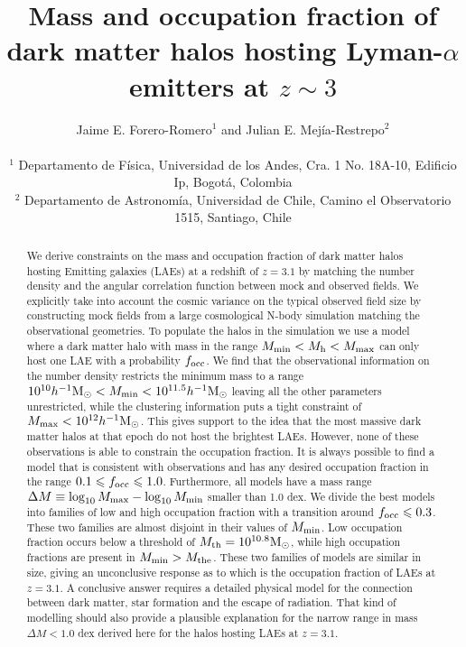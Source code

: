\documentclass[usenatbib]{mn2e}
\newcommand{\ly}{{\ifmmode{{\rm Ly}\alpha}\else{Ly$\alpha$~}\fi}}
\newcommand{\hMsun}{{\ifmmode{h^{-1}{\rm
        {M_{\odot}}}}\else{$h^{-1}{\rm{M_{\odot}}}$}\fi}}
\newcommand{\Msun}{{\ifmmode{{\rm {M_{\odot}}}}\else{${\rm{M_{\odot}}}$}\fi}}
\begin{document}
\title[Halo mass and occupation fraction for LAEs at
  $z=3.1$]{Mass and occupation
  fraction of dark matter halos hosting Lyman-$\alpha$ emitters
  at $z\sim 3$}    
\author[~J.~E. Forero-Romero and ~J.~E Mejia-Restreo]{
\parbox[t]{\textwidth}{\raggedright 
  Jaime E. Forero-Romero$^{1}$ and
  Julian E. Mej\'ia-Restrepo$^{2}$ 
}
\vspace*{6pt}\\
$^{1}$ Departamento de F\'{i}sica, Universidad de los Andes, Cra. 1
No. 18A-10, Edificio Ip, Bogot\'a, Colombia \\
$^{2}$ Departamento de Astronom\'{i}a, Universidad de Chile, Camino el
Observatorio 1515, Santiago, Chile} 

\maketitle

\begin{abstract}
%
We derive constraints on the mass and occupation fraction of dark
matter halos hosting \ly Emitting galaxies (LAEs) at a redshift of
$z=3.1$ by matching the number density and the angular
correlation function between mock and observed fields. We explicitly
take into account the cosmic variance on the typical observed field size by
constructing mock fields from a large cosmological N-body
simulation matching the observational geometries. To populate the
halos in the simulation we use a model where a dark matter halo with
mass in the range $M_{\rm   min}<M_{\rm h}<M_{\rm max}$ can only host
one LAE with a probability $f_{\rm occ}$.  We find that the observational information on the number density restricts the minimum mass to a
range $10^{10}\hMsun < M_{\rm min}< 10^{11.5}\hMsun$ leaving all the
other parameters unrestricted, while the clustering information puts a
tight constraint of $M_{\rm   max}<10^{12}\hMsun$. This gives support
to the idea that the most massive dark matter halos at that epoch do
not host the brightest LAEs.  However, none of these observations is
able to constrain the occupation fraction. It is always possible to
find a model that is consistent with observations and has any desired
occupation fraction in the range $0.1\leq f_{\rm occ}\leq
1.0$. Furthermore, all models have a mass range $\Delta M \equiv
\log_{10}M_{\rm max} - \log_{10} M_{\rm min}$ smaller than 1.0 dex. 
We divide the best models into families of low and high occupation
fraction with a transition around $f_{\rm occ}\leq 0.3$. These two
families are almost disjoint in their values of $M_{\rm min}$. Low
occupation fraction occurs below a threshold of $M_{\rm th}=
10^{10.8}\Msun$, while high occupation fractions are present in
$M_{\rm min}>M_{\rm the}$. These two families of models are
similar in size, giving an unconclusive response as to which is the
occupation fraction of LAEs at $z=3.1$. A conclusive answer requires
a detailed physical model for the  connection between dark matter,
star formation and the escape of \ly radiation. That kind of modelling
should also provide a plausible explanation for the narrow range in
mass $\Delta M<1.0$ dex derived here for the halos hosting LAEs at
$z=3.1$.

\end{abstract}
\end{document}
